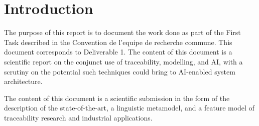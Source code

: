 \section{Introduction}
\label{sect:intro}


The purpose of this report is to document the work done as part of the First Task described in the Convention
de l’equipe de recherche commune. This document corresponds to Deliverable 1. The content of this document is a scientific report on the conjunct use of traceability, modelling, and AI, with a scrutiny on the potential such techniques could bring to AI-enabled system architecture. 

The content of this document is a scientific submission in the form of the description of the state-of-the-art, a linguistic metamodel, and a feature model of traceability research and industrial applications.


